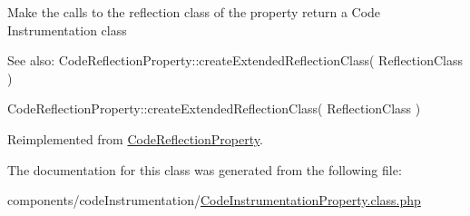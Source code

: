 Make the calls to the reflection class of the property return a Code Instrumentation class

\begin{Desc}
\item[See also:]CodeReflectionProperty::createExtendedReflectionClass( ReflectionClass ) 

CodeReflectionProperty::createExtendedReflectionClass( ReflectionClass ) \end{Desc}


Reimplemented from \hyperlink{class_code_reflection_property_ada66f395b16622378963471801f11ad}{CodeReflectionProperty}.

The documentation for this class was generated from the following file:\begin{CompactItemize}
\item 
components/codeInstrumentation/\hyperlink{_code_instrumentation_property_8class_8php}{CodeInstrumentationProperty.class.php}\end{CompactItemize}
